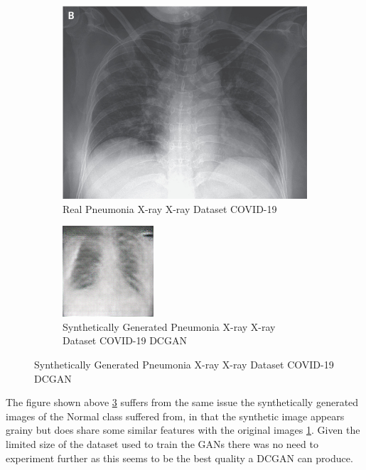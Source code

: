  \begin{figure}[H]
    \centering
    \begin{subfigure}{.4\textwidth}
    \centering
      \includegraphics[width=.4\linewidth,keepaspectratio]{Images/ExampleOfPneumoniaXrayXrayCOVID19Dataset.jpeg}
      \caption{Real Pneumonia X-ray X-ray Dataset COVID-19}
      \label{fig:Real Pneumonia X-ray X-ray Dataset COVID-19}
    \end{subfigure}\hfill%
    \begin{subfigure}{.4\textwidth}
    \centering
      \includegraphics[width=.4\linewidth,keepaspectratio]{Images/ExampleOfSyntheticallyGeneratedPneumoniaXrayCOVID19XrayDatasetDCGAN.png}
      \caption{Synthetically Generated Pneumonia X-ray X-ray Dataset COVID-19 DCGAN}
      \label{fig:Synthetically Generated Pneumonia X-ray X-ray Dataset COVID-19 DCGAN}
    \end{subfigure}\hfill%
\end{figure}
The figure shown above \ref{fig:Synthetically Generated Pneumonia X-ray X-ray Dataset COVID-19 DCGAN} suffers from the same issue the synthetically generated images of the Normal class suffered from, in that the synthetic image appears grainy but does share some similar features with the original images \ref{fig:Real Pneumonia X-ray X-ray Dataset COVID-19}.  Given the limited size of the dataset used to train the GANs there was no need to experiment further as this seems to be the best quality a DCGAN can produce.
